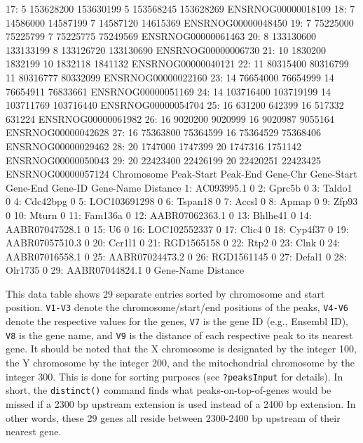 \documentclass[12pt]{article}
\begin{document}
\begin{Schunk}
\begin{Soutput}
17:          5  153628200 153630199        5  153568245 153628269 ENSRNOG00000018109
18:          7   14586000  14587199        7   14587120  14615369 ENSRNOG00000048450
19:          7   75225000  75225799        7   75225775  75249569 ENSRNOG00000061463
20:          8  133130600 133133199        8  133126720 133130690 ENSRNOG00000006730
21:         10    1830200   1832199       10    1832118   1841132 ENSRNOG00000040121
22:         11   80315400  80316799       11   80316777  80332099 ENSRNOG00000022160
23:         14   76654000  76654999       14   76654911  76833661 ENSRNOG00000051169
24:         14  103716400 103719199       14  103711769 103716440 ENSRNOG00000054704
25:         16     631200    642399       16     517332    631224 ENSRNOG00000061982
26:         16    9020200   9020999       16    9020987   9055164 ENSRNOG00000042628
27:         16   75363800  75364599       16   75364529  75368406 ENSRNOG00000029462
28:         20    1747000   1747399       20    1747316   1751142 ENSRNOG00000050043
29:         20   22423400  22426199       20   22420251  22423425 ENSRNOG00000057124
    Chromosome Peak-Start  Peak-End Gene-Chr Gene-Start  Gene-End            Gene-ID
         Gene-Name Distance
 1:     AC093995.1        0
 2:         Gprc5b        0
 3:         Taldo1        0
 4:       Cdc42bpg        0
 5:   LOC103691298        0
 6:        Tspan18        0
 7:          Accsl        0
 8:          Apmap        0
 9:          Zfp93        0
10:          Mturn        0
11:        Fam136a        0
12: AABR07062363.1        0
13:        Bhlhe41        0
14: AABR07047528.1        0
15:             U6        0
16:   LOC102552337        0
17:          Clic4        0
18:        Cyp4f37        0
19: AABR07057510.3        0
20:         Ccr1l1        0
21:     RGD1565158        0
22:           Rtp2        0
23:           Clnk        0
24: AABR07016558.1        0
25: AABR07024473.2        0
26:     RGD1561145        0
27:         Defal1        0
28:        Olr1735        0
29: AABR07044824.1        0
         Gene-Name Distance
\end{Soutput}
\end{Schunk}

This data table shows 29 separate entries sorted by chromosome and start position.  \texttt{V1-V3} denote the chromosome/start/end positions of the peaks, \texttt{V4-V6} denote the respective values for the genes, \texttt{V7} is the gene ID (e.g., Ensembl ID), \texttt{V8} is the gene name, and \texttt{V9} is the distance of each respective peak to its nearest gene.  It should be noted that the X chromosome is designated by the integer 100, the Y chromosome by the integer 200, and the mitochondrial chromosome by the integer 300.  This is done for sorting purposes (see \texttt{?peaksInput} for details).  In short, the \texttt{distinct()} command finds what peaks-on-top-of-genes would be missed if a 2300 bp upstream extension is used instead of a 2400 bp extension.  In other words, these 29 genes all reside between 2300-2400 bp upstream of their nearest gene.
\end{document}
